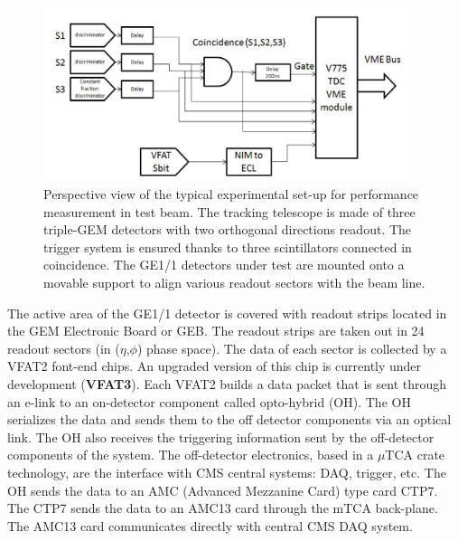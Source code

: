 \begin{figure}[!htbp]
\centering
\includegraphics[width=0.95\textwidth]{figures/GEM/daq.png}
\caption{Perspective view of the typical experimental set-up for performance measurement in test beam. The tracking telescope is made of three triple-GEM detectors with two orthogonal directions readout. The trigger system is ensured thanks to three scintillators connected in coincidence. The GE1/1 detectors under test are mounted onto a movable support to align various readout sectors with the beam line.}\label{fig:tbs}
\end{figure}
The active area of the GE1/1 detector is covered with readout strips located in the GEM Electronic Board or GEB. 
The readout strips are taken out in 24 readout sectors (in ($\eta$,$\phi$) phase space). The data of each sector is collected by a VFAT2 font-end chips. 
An upgraded version of this chip is currently under development (\textbf{VFAT3}). 
Each VFAT2 builds a data packet that is sent through an e-link to an on-detector component called opto-hybrid (OH). 
The OH serializes the data and sends them to the off detector components via an optical link. 
The OH also receives the triggering information sent by the off-detector components of the system. 
The off-detector electronics, based in a $\mu$TCA crate technology, are the interface with CMS central systems: DAQ, trigger, etc. 
The OH sends the data to an AMC (Advanced Mezzanine Card) type card CTP7. The CTP7 sends the data to an AMC13 card through the mTCA back-plane. 
The AMC13 card communicates directly with central CMS DAQ system.

